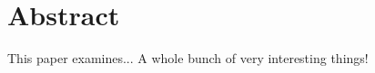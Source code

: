 \section{Abstract}

\noindent This paper examines... A whole bunch of very interesting things! \lipsum[1]